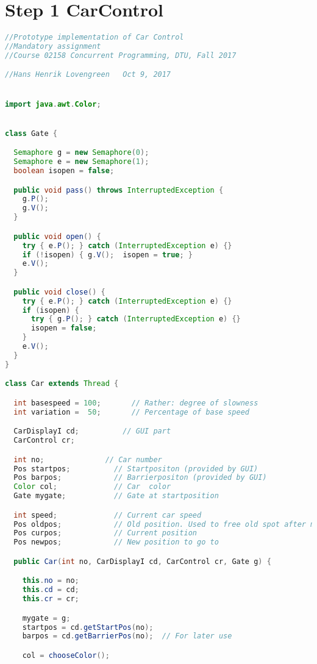 \section*{Step 1 CarControl}
\begin{lstlisting}[language=java]
//Prototype implementation of Car Control
//Mandatory assignment
//Course 02158 Concurrent Programming, DTU, Fall 2017

//Hans Henrik Lovengreen   Oct 9, 2017


import java.awt.Color;


class Gate {

  Semaphore g = new Semaphore(0);
  Semaphore e = new Semaphore(1);
  boolean isopen = false;

  public void pass() throws InterruptedException {
    g.P(); 
    g.V();
  }

  public void open() {
    try { e.P(); } catch (InterruptedException e) {}
    if (!isopen) { g.V();  isopen = true; }
    e.V();
  }

  public void close() {
    try { e.P(); } catch (InterruptedException e) {}
    if (isopen) { 
      try { g.P(); } catch (InterruptedException e) {}
      isopen = false;
    }
    e.V();
  }
}

class Car extends Thread {

  int basespeed = 100;       // Rather: degree of slowness
  int variation =  50;       // Percentage of base speed

  CarDisplayI cd;          // GUI part
  CarControl cr;

  int no;              // Car number
  Pos startpos;          // Startpositon (provided by GUI)
  Pos barpos;            // Barrierpositon (provided by GUI)
  Color col;             // Car  color
  Gate mygate;           // Gate at startposition

  int speed;             // Current car speed
  Pos oldpos;            // Old position. Used to free old spot after move.
  Pos curpos;            // Current position 
  Pos newpos;            // New position to go to

  public Car(int no, CarDisplayI cd, CarControl cr, Gate g) {

    this.no = no;
    this.cd = cd;
    this.cr = cr;

    mygate = g;
    startpos = cd.getStartPos(no);
    barpos = cd.getBarrierPos(no);  // For later use

    col = chooseColor();


\end{lstlisting}
